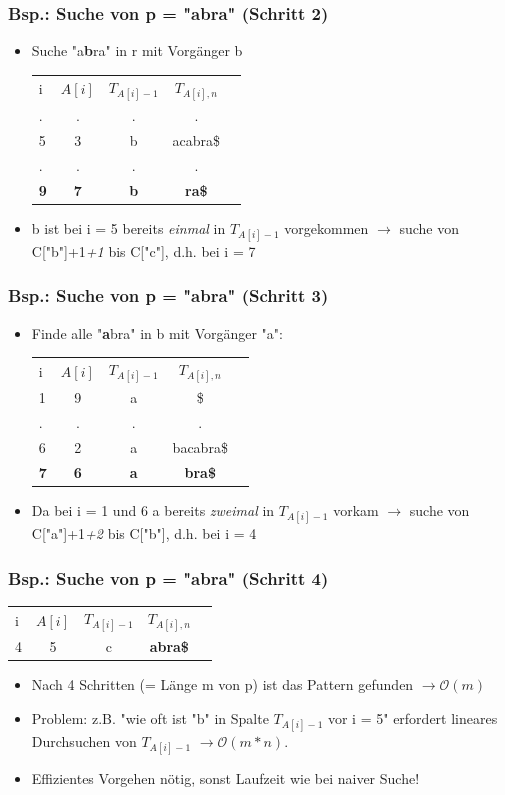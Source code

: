 \documentclass{beamer}
\begin{document}
\begin{frame}
\frametitle{Bsp.: Suche von p = "abra" (Schritt 2)}
\begin{itemize}
\item Suche "a\color{red}\textbf{b}\color{black}ra" in r mit Vorg\"anger b
\begin{tabular}{l c cc r}
i & $A[i]$ & $T_{A[i]-1}$ & $T_{A[i],n}$\\
. & . & . & .\\
5 & 3 & b & acabra\$ \\
. & . & . & .\\
\textbf{9} & \textbf{7} & \color{red}\textbf{b} & \textbf{ra\$} \\
\end{tabular}
\item b ist bei i = 5 bereits \textit{einmal} in $T_{A[i]-1}$ vorgekommen $\rightarrow$ suche von C["b"]+1\textit{+1} bis C["c"], d.h. bei i = 7
\end{itemize}
\end{frame}
\begin{frame}
\frametitle{Bsp.: Suche von p = "abra" (Schritt 3)}
\begin{itemize}
\item Finde alle "\color{red}\textbf{a}\color{black}bra" in b mit Vorg\"anger "a":
\begin{tabular}{l c cc r}
i & $A[i]$ & $T_{A[i]-1}$ & $T_{A[i],n}$\\
1 & 9 & a & \$ \\
. & . & . & .\\
6 & 2 & a & bacabra\$ \\
\textbf{7} & \textbf{6}  & \color{red}\textbf{a} & \textbf{bra\$} \\
\end{tabular}
\item Da bei i = 1 und 6 a bereits \textit{zweimal} in $T_{A[i]-1}$ vorkam $\rightarrow$ suche von C["a"]+1\textit{+2} bis C["b"], d.h. bei i = 4
\end{itemize}
\end{frame}
\begin{frame}
\frametitle{Bsp.: Suche von p = "abra" (Schritt 4)}
\begin{tabular}{l c cc r}
i & $A[i]$ & $T_{A[i]-1}$ & $T_{A[i],n}$\\
4 & 5 & c & \color{red}\textbf{abra\$} \\
\end{tabular}
\begin{itemize}
\item Nach 4 Schritten (= L\"ange m von p) ist das Pattern gefunden $\rightarrow \mathcal{O}(m)$
\item Problem: z.B. "wie oft ist "b" in Spalte $T_{A[i]-1}$ vor i = 5" erfordert lineares Durchsuchen von $T_{A[i]-1}$ $\rightarrow { \scriptstyle \mathcal{O	}}(m*n)$.
\item Effizientes Vorgehen n\"otig, sonst Laufzeit wie bei naiver Suche!
\end{itemize}
\end{frame}
\end{document}
